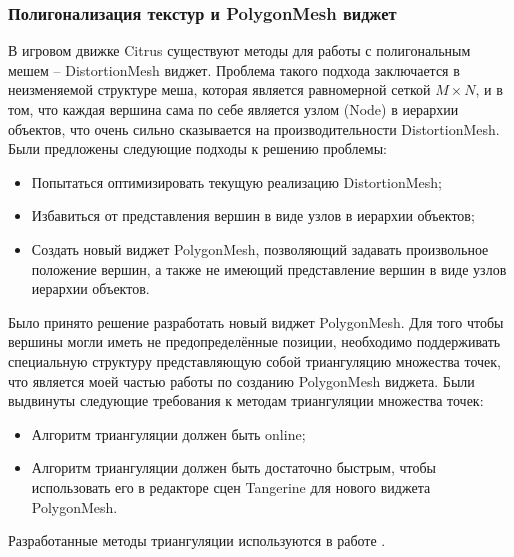 \documentclass{fefu}
\begin{document}
\subsubsection{Полигонализация текстур и PolygonMesh виджет}
В игровом движке Citrus существуют методы для работы с полигональным мешем --
DistortionMesh виджет. Проблема такого подхода заключается в неизменяемой структуре меша, которая является равномерной
сеткой $M\times N$, и в том, что каждая вершина сама по себе является узлом (Node) в иерархии объектов, что очень сильно
сказывается на производительности DistortionMesh. Были предложены следующие подходы к решению проблемы:
\begin{itemize}
    \item Попытаться оптимизировать текущую реализацию DistortionMesh;
    \item Избавиться от представления вершин в виде узлов в иерархии объектов;
    \item Создать новый виджет PolygonMesh, позволяющий задавать произвольное положение вершин, а также не имеющий
    представление вершин в виде узлов иерархии объектов.
\end{itemize}
Было принято решение разработать новый виджет PolygonMesh. Для того чтобы вершины могли
иметь не предопределённые позиции, необходимо поддерживать специальную структуру представляющую собой
триангуляцию множества точек, что является моей частью работы по созданию PolygonMesh виджета. Были выдвинуты
следующие требования к методам триангуляции множества точек:
\begin{itemize}
    \item Алгоритм триангуляции должен быть online;
    \item Алгоритм триангуляции должен быть достаточно быстрым, чтобы использовать его в редакторе сцен
    Tangerine для нового виджета PolygonMesh.
\end{itemize}
Разработанные методы триангуляции используются в работе \cite{Gomenyuk}.
\end{document}
